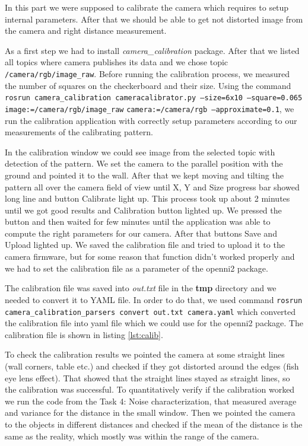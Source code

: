 \documentclass[11pt]{article}
\begin{document}
In this part we were supposed to calibrate the camera which requires to setup
internal parameters. After that we should be able to get not distorted image
from the camera and right distance measurement. \par

As a first step we had to install \emph{camera\_calibration} package. After that
we listed all topics where camera publishes its data and we chose topic
\texttt{/camera/rgb/image\_raw}. Before running the calibration process, we
measured the number of squares on the checkerboard and their size. Using the
command \texttt{rosrun camera\_calibration cameracalibrator.py --size=6x10
  --square=0.065 image:=/camera/rgb/image\_raw}{ } \texttt{camera:=/camera/rgb
  --approximate=0.1}, we run the calibration application with correctly setup
parameters according to our measurements of the calibrating pattern. \par

In the calibration window we could see image from the selected topic with
detection of the pattern. We set the camera to the parallel position with the
ground and pointed it to the wall. After that we kept moving and tilting the
pattern all over the camera field of view until X, Y and Size progress bar
showed long line and button Calibrate light up. This process took up about 2
minutes until we got good results and Calibration button lighted up. We pressed
the button and then waited for few minutes until the application was able to
compute the right parameters for our camera. After that buttons Save and Upload
lighted up. We saved the calibration file and tried to upload it to the camera
firmware, but for some reason that function didn't worked properly and we had to
set the calibration file as a parameter of the openni2 package. \par
        
The calibration file was saved into \emph{out.txt} file in the \textbf{tmp}
directory and we needed to convert it to YAML file. In order to do that, we used
command \texttt{rosrun camera\_calibration\_parsers convert out.txt camera.yaml}
which converted the calibration file into yaml file which we could use for the
openni2 package. The calibration file is shown in listing \vref{lst:calib}. \par
        
To check the calibration results we pointed the camera at some straight lines
(wall corners, table etc.) and checked if they got distorted around the
edges (fish eye lens effect). That showed that the straight lines stayed as 
straight lines, so the
calibration was successful. To quantitatively verify if the calibration worked
we run the code from the Task 4: Noise characterization, that measured average
and variance for the distance in the small window. Then we pointed the camera to
the objects in different distances and checked if the mean of the distance is
the same as the reality, which mostly was within the range of the camera. \par
\end{document}
